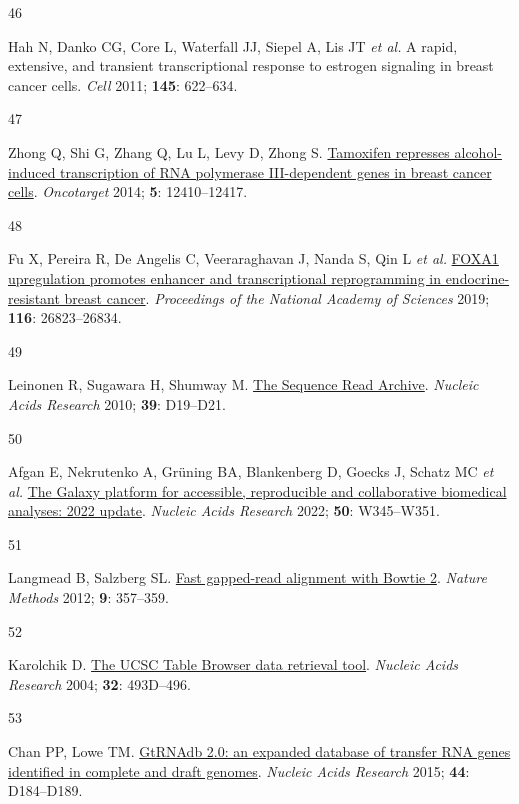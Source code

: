 \documentclass[
  12pt,
]{article}
\newlength{\cslhangindent}
\newlength{\csllabelwidth}
\newlength{\cslentryspacingunit} %
\newenvironment{CSLReferences}[2] %
 {%
  \setlength{\parindent}{0pt}
  \ifodd #1
  \let\oldpar\par
  \def\par{\hangindent=\cslhangindent\oldpar}
  \fi
  \setlength{\parskip}{#2\cslentryspacingunit}
 }%
 {}
\newcommand{\CSLLeftMargin}[1]{\parbox[t]{\csllabelwidth}{#1}}
\newcommand{\CSLRightInline}[1]{\parbox[t]{\linewidth - \csllabelwidth}{#1}\break}
\begin{document}
\begin{CSLReferences}{0}{0}
\leavevmode{}%
\CSLLeftMargin{46 }%
\CSLRightInline{Hah N, Danko CG, Core L, Waterfall JJ, Siepel A, Lis JT \emph{et al.} A rapid, extensive, and transient transcriptional response to estrogen signaling in breast cancer cells. \emph{Cell} 2011; \textbf{145}: 622--634.}

\leavevmode{}%
\CSLLeftMargin{47 }%
\CSLRightInline{Zhong Q, Shi G, Zhang Q, Lu L, Levy D, Zhong S. \href{https://doi.org/10.18632/oncotarget.2678}{Tamoxifen represses alcohol-induced transcription of RNA polymerase III-dependent genes in breast cancer cells}. \emph{Oncotarget} 2014; \textbf{5}: 12410--12417.}

\leavevmode{}%
\CSLLeftMargin{48 }%
\CSLRightInline{Fu X, Pereira R, De Angelis C, Veeraraghavan J, Nanda S, Qin L \emph{et al.} \href{https://doi.org/10.1073/pnas.1911584116}{FOXA1 upregulation promotes enhancer and transcriptional reprogramming in endocrine-resistant breast cancer}. \emph{Proceedings of the National Academy of Sciences} 2019; \textbf{116}: 26823--26834.}

\leavevmode{}%
\CSLLeftMargin{49 }%
\CSLRightInline{Leinonen R, Sugawara H, Shumway M. \href{https://doi.org/10.1093/nar/gkq1019}{The Sequence Read Archive}. \emph{Nucleic Acids Research} 2010; \textbf{39}: D19--D21.}

\leavevmode{}%
\CSLLeftMargin{50 }%
\CSLRightInline{Afgan E, Nekrutenko A, Grüning BA, Blankenberg D, Goecks J, Schatz MC \emph{et al.} \href{https://doi.org/10.1093/nar/gkac247}{The Galaxy platform for accessible, reproducible and collaborative biomedical analyses: 2022 update}. \emph{Nucleic Acids Research} 2022; \textbf{50}: W345--W351.}

\leavevmode{}%
\CSLLeftMargin{51 }%
\CSLRightInline{Langmead B, Salzberg SL. \href{https://doi.org/10.1038/nmeth.1923}{Fast gapped-read alignment with Bowtie 2}. \emph{Nature Methods} 2012; \textbf{9}: 357--359.}

\leavevmode{}%
\CSLLeftMargin{52 }%
\CSLRightInline{Karolchik D. \href{https://doi.org/10.1093/nar/gkh103}{The UCSC Table Browser data retrieval tool}. \emph{Nucleic Acids Research} 2004; \textbf{32}: 493D--496.}

\leavevmode{}%
\CSLLeftMargin{53 }%
\CSLRightInline{Chan PP, Lowe TM. \href{https://doi.org/10.1093/nar/gkv1309}{GtRNAdb 2.0: an expanded database of transfer RNA genes identified in complete and draft genomes}. \emph{Nucleic Acids Research} 2015; \textbf{44}: D184--D189.}


\end{CSLReferences}
\end{document}
